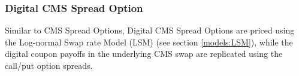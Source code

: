 \subsubsection{Digital CMS Spread Option}
\label{pricing:ir_digitalcmsspreadoption}

Similar to CMS Spread Options, Digital CMS Spread Options are priced using the
Log-normal Swap rate Model (LSM) (see section \ref{models:LSM}), while the
digital coupon payoffs in the underlying CMS swap are replicated using the
call/put option spreads.